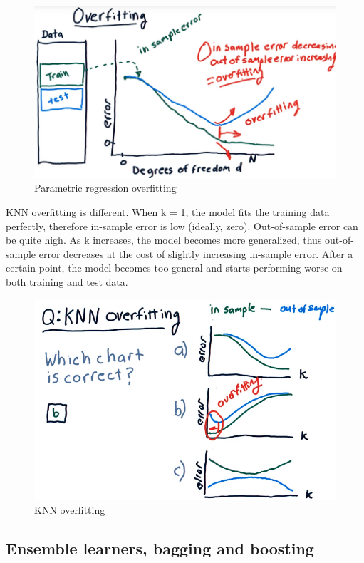 \documentclass[12pt]{article}
\begin{document}
\begin{figure}[!ht]
\centering
\includegraphics[scale=0.4]{fig/fig90}
\caption{Parametric regression overfitting}
\end{figure}

KNN overfitting is different. When k = 1, the model fits the training data perfectly, therefore in-sample error is low (ideally, zero).  Out-of-sample error can be quite high. As k increases, the model becomes more generalized, thus out-of-sample error decreases at the cost of slightly increasing in-sample error. After a certain point, the model becomes too general and starts performing worse on both training and test data.

\begin{figure}[!ht]
\centering
\includegraphics[scale=0.4]{fig/fig91}
\caption{KNN overfitting}
\end{figure}

\subsection{Ensemble learners, bagging and boosting}
\end{document}
